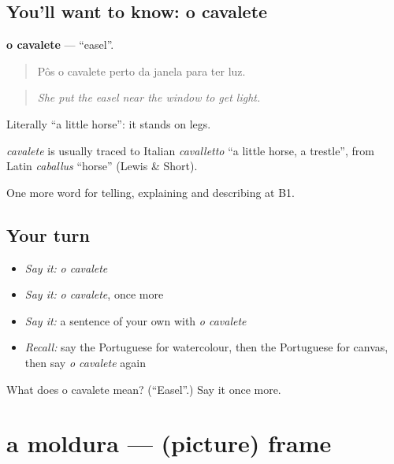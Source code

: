 \subsection*{You'll want to know: o cavalete}
\textbf{o cavalete} — \textquotedblleft{}easel\textquotedblright{}.

\begin{quote}
Pôs o cavalete perto da janela para ter luz.
\end{quote}

\begin{quote}
\emph{She put the easel near the window to get light.}
\end{quote}

Literally \textquotedblleft{}a little horse\textquotedblright{}: it stands on legs.

\begin{cousinweb}
\emph{cavalete} is usually traced to Italian \emph{cavalletto} \textquotedblleft{}a little horse, a trestle\textquotedblright{}, from Latin \emph{caballus} \textquotedblleft{}horse\textquotedblright{} (Lewis \& Short).
\end{cousinweb}

\begin{grammarlens}[title={What you've built}]
One more word for telling, explaining and describing at B1.
\end{grammarlens}

\subsection*{Your turn}
\begin{itemize}
\raggedright
  \item \emph{Say it:} \emph{o cavalete}
  \item \emph{Say it:} \emph{o cavalete}, once more
  \item \emph{Say it:} a sentence of your own with \emph{o cavalete}
  \item \emph{Recall:} say the Portuguese for watercolour, then the Portuguese for canvas, then say \emph{o cavalete} again
\end{itemize}

\begin{tcolorbox}[breakable,colback=teal!4,colframe=teal!35!black,title={Before you move on}]
What does o cavalete mean? (\textquotedblleft{}Easel\textquotedblright{}.) Say it once more.
\end{tcolorbox}
\section[a moldura]{a moldura — (picture) frame}

